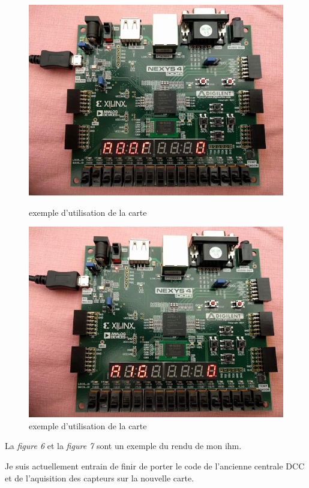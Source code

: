 \begin{figure}[ht]
    \begin{minipage}[c]{.46\linewidth}
        \centering
        \includegraphics[scale=0.25]{exe_add.jpg}
        \caption{exemple d'utilisation de la carte}
        \label{fig7}
    \end{minipage}
    \hfill%
    \begin{minipage}[c]{.46\linewidth}
        \centering
        \includegraphics[scale=0.25]{exe_aigui.jpg}
        \caption{exemple d'utilisation de la carte}
        \label{fig8}
    \end{minipage}
\end{figure}

La \emph{figure 6} et la \emph{figure 7} sont un exemple du rendu de
mon ihm.

Je suis actuellement entrain de finir de porter le code de l'ancienne
centrale DCC et de l'aquisition des capteurs sur la nouvelle carte.

\newpage





